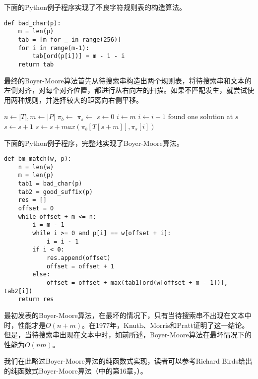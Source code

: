 \documentclass[UTF8]{article}
\begin{document}
下面的Python例子程序实现了不良字符规则表的构造算法。

\lstset{language=Python}
\begin{lstlisting}
def bad_char(p):
    m = len(p)
    tab = [m for _ in range(256)]
    for i in range(m-1):
        tab[ord(p[i])] = m - 1 - i
    return tab
\end{lstlisting}

最终的Boyer-Moore算法首先从待搜索串构造出两个规则表，将待搜索串和文本的左侧对齐，对每个对齐位置，都进行从右向左的扫描。如果不匹配发生，就尝试使用两种规则，并选择较大的距离向右侧平移。

\begin{algorithmic}[1]
  \State $n \gets |T|, m \gets |P|$
  \State $\pi_b \gets$ 
  \State $\pi_s \gets$ 
  \State $s \gets 0$
    \State $i \gets m$
      \State $i \gets i - 1$
    \EndWhile
      \State found one solution at $s$
      \State $s \gets s + 1$ 
    \Else
      \State $s \gets s + max(\pi_b[T[s + m]], \pi_s[i])$
    \EndIf
  \EndWhile
\EndFunction
\end{algorithmic}

下面的Python例子程序，完整地实现了Boyer-Moore算法。

\lstset{language=Python}
\begin{lstlisting}
def bm_match(w, p):
    n = len(w)
    m = len(p)
    tab1 = bad_char(p)
    tab2 = good_suffix(p)
    res = []
    offset = 0
    while offset + m <= n:
        i = m - 1
        while i >= 0 and p[i] == w[offset + i]:
            i = i - 1
        if i < 0:
            res.append(offset)
            offset = offset + 1
        else:
            offset = offset + max(tab1[ord(w[offset + m - 1])], tab2[i])
    return res
\end{lstlisting}

最初发表的Boyer-Moore算法，在最坏的情况下，只有当待搜索串不出现在文本中时，性能才是$O(n+m)$\cite{boyer-moore}。在1977年，Knuth、Morris和Pratt证明了这一结论。但是，当待搜索串出现在文本中时，如前所述，Boyer-Moore算法在最坏情况下的性能为$O(nm)$。

我们在此略过Boyer-Moore算法的纯函数式实现，读者可以参考Richard Birds给出的纯函数式Boyer-Moore算法（\cite{fp-pearls}中的第16章，）。
\end{document}
